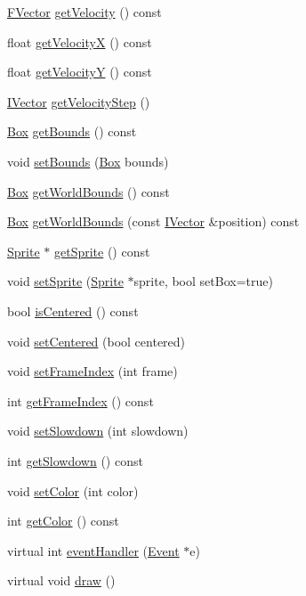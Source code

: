 \begin{DoxyCompactItemize}
\hyperlink{class_f_vector}{F\+Vector} \hyperlink{class_object_a4f1958fae32120d02efcecd7b1beab0a}{get\+Velocity} () const 
\item 
float \hyperlink{class_object_a38db2c22257704f142a381489a14fab7}{get\+Velocity\+X} () const 
\item 
float \hyperlink{class_object_abaa3cb97d49316883310e039de172dd4}{get\+Velocity\+Y} () const 
\item 
\hyperlink{class_i_vector}{I\+Vector} \hyperlink{class_object_a3589d53e0f2594f92b946b1b40a07c75}{get\+Velocity\+Step} ()
\item 
\hyperlink{class_box}{Box} \hyperlink{class_object_a75472ab21010cf9c8da2046076ec09e1}{get\+Bounds} () const 
\item 
void \hyperlink{class_object_a2ee8e04108059dc5ca44ef6bfdc8543f}{set\+Bounds} (\hyperlink{class_box}{Box} bounds)
\item 
\hyperlink{class_box}{Box} \hyperlink{class_object_abc47b6c91a4ea3605c00039c5c8ba0f3}{get\+World\+Bounds} () const 
\item 
\hyperlink{class_box}{Box} \hyperlink{class_object_a478c8650ee8250fc9d44c0a6e8b6c5f2}{get\+World\+Bounds} (const \hyperlink{class_i_vector}{I\+Vector} \&position) const 
\item 
\hyperlink{class_sprite}{Sprite} $\ast$ \hyperlink{class_object_aae255594aef34a3db3bd15b5af41a5af}{get\+Sprite} () const 
\item 
void \hyperlink{class_object_adabc85f4c580093594250b677b8573d7}{set\+Sprite} (\hyperlink{class_sprite}{Sprite} $\ast$sprite, bool set\+Box=true)
\item 
bool \hyperlink{class_object_a517454b636773a14b7710b78734056f3}{is\+Centered} () const 
\item 
void \hyperlink{class_object_a8eac55a24936bb18524c96fe00189404}{set\+Centered} (bool centered)
\item 
void \hyperlink{class_object_add0a363fc8351f966979f61c75232bd9}{set\+Frame\+Index} (int frame)
\item 
int \hyperlink{class_object_a85ef29d394641a1f96cab82217245d51}{get\+Frame\+Index} () const 
\item 
void \hyperlink{class_object_ab753d38950b3e3ea3a0d1c53c4912c38}{set\+Slowdown} (int slowdown)
\item 
int \hyperlink{class_object_aeec8faca38e258b6ec6b5298956c15b2}{get\+Slowdown} () const 
\item 
void \hyperlink{class_object_a937aa61549bbcea2c02f43ae24cd73ef}{set\+Color} (int color)
\item 
int \hyperlink{class_object_ae5e6499a684d0e46c2609b219650e598}{get\+Color} () const 
\item 
virtual int \hyperlink{class_object_aef5d6ac71c5184a72e7101584d377998}{event\+Handler} (\hyperlink{class_event}{Event} $\ast$e)
\item 
virtual void \hyperlink{class_object_a821f5b25b450fa1acdb3f9c0b5962592}{draw} ()
\end{DoxyCompactItemize}


